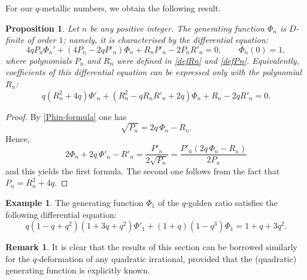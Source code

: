 \documentclass[11pt,reqno]{amsart}
\theoremstyle{plain}
\newtheorem{proposition}[lemme]{Proposition}
\theoremstyle{definition}
\newtheorem{remarque}[lemme]{Remark}
\newtheorem{exemple}[lemme]{Example}
\numberwithin{figure}{section}
\numberwithin{table}{section}
\numberwithin{equation}{section}
\let\fr=\frac
\begin{document}
For our $q$-metallic numbers, we obtain the following result.

\begin{proposition} Let $n$ be any positive integer. The generating function $\Phi_n$ is $D$-finite of order $1$; namely, it is characterised by the differential equation:
\begin{equation*}
4qP_n\Phi_n'+(4P_n-2qP'_n)\Phi_n+R_nP'_n-2P_nR'_n=0, \qquad \Phi_n(0)=1,
\end{equation*}
where polynomials $P_n$ and $R_n$ were defined in \eqref{defRn} and \eqref{defPn}. Equivalently,  coefficients of this differential equation can be expressed only with the polynomial $R_n$:
\begin{equation*}
q(R_n^2+4q)\Phi'_n+(R_n^2-q R_n R'_n+2q)\Phi_n+R_n-2qR'_n=0.
\end{equation*} 
\end{proposition}

\begin{proof}
By \eqref{Phin-formula} one has
\begin{equation*}
\sqrt{P_n}=2q\,\Phi_n-R_n.
\end{equation*}
Hence, 
\begin{equation*}
2\Phi_n+2q\,\Phi'_n-R'_n=\fr{P'_n}{2\sqrt{P_n}}=\fr{P'_n(2q\,\Phi_n-R_n)}{2P_n}
\end{equation*}
and this yields the first formula. The second one follows from the fact that $P_n=R_n^2+4q$.
\end{proof}

\begin{exemple} The generating function $\Phi_1$ of the $q$-golden ratio satisfies the following differential equation:
\begin{equation*}
q(1-q+q^2)(1+3q+q^2)\Phi'_1+(1+q)(1-q^3)\Phi_1=1+q+3q^2.
\end{equation*}
\end{exemple}

\begin{remarque}
It is clear that the results of this section can be borrowed similarly for the  $q$-deformation of any quadratic irrational, provided that the (quadratic) generating function is explicitly known.
\end{remarque}
\end{document}

